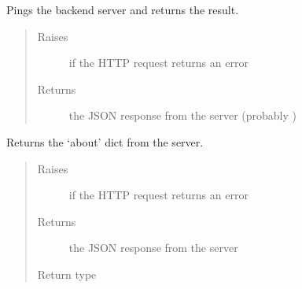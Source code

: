 \documentclass[letterpaper,10pt,english]{sphinxmanual}
\begin{document}
\begin{fulllineitems}

\begin{fulllineitems}
\label{\detokenize{autoapi/pine/client/client/index:pine.client.client.PineClient.ping}}
Pings the backend server and returns the result.
\begin{quote}\begin{description}
\item[{Raises}] \leavevmode
{\hyperref[\detokenize{autoapi/pine/client/exceptions/index:pine.client.exceptions.PineClientHttpException}]{}} \textendash{} if the HTTP request returns an error

\item[{Returns}] \leavevmode
the JSON response from the server (probably )

\end{description}\end{quote}

\end{fulllineitems}


\begin{fulllineitems}
\label{\detokenize{autoapi/pine/client/client/index:pine.client.client.PineClient.about}}
Returns the ‘about’ dict from the server.
\begin{quote}\begin{description}
\item[{Raises}] \leavevmode
{\hyperref[\detokenize{autoapi/pine/client/exceptions/index:pine.client.exceptions.PineClientHttpException}]{}} \textendash{} if the HTTP request returns an error

\item[{Returns}] \leavevmode
the JSON response from the server

\item[{Return type}] \leavevmode
{}


\end{description}
\end{quote}
\end{fulllineitems}
\end{fulllineitems}
\end{document}
